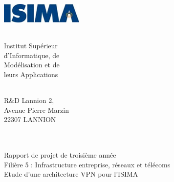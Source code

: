 \begin{titlepage}
	\begin{minipage}{0.5\textwidth}
		\begin{flushleft} \large
			\includegraphics[height=1cm]{images/logo-isima.png}\\
		\end{flushleft}
	\end{minipage}
	\begin{minipage}{0.43\textwidth}
		\begin{flushright} \large
		\end{flushright}
	\end{minipage}
	
	\begin{minipage}{0.5\textwidth}
		\begin{flushleft} \large
			~\\
			Institut Supérieur\\
			d'Informatique, de\\
			Modélisation et de\\
			leurs Applications
		\end{flushleft}
	\end{minipage}
	\begin{minipage}{0.415\textwidth}
		\begin{flushright} \large
			~\\
			R\&D Lannion 2,\\
			Avenue Pierre Marzin\\
			22307 LANNION\\
			~
		\end{flushright}
	\end{minipage}

	\vfill
	\begin{center}
		\Hrule \\[0.4cm]
		\Large{Rapport de projet de troisième année}\\
		\Large Filière 5 : Infrastructure entreprise, réseaux et télécoms\\[1.2cm]
		\Huge{Etude d'une architecture VPN pour l'ISIMA}\\[0.4cm]
		\Hrule \\[0.4cm]
	\end{center}
	

\end{titlepage}
